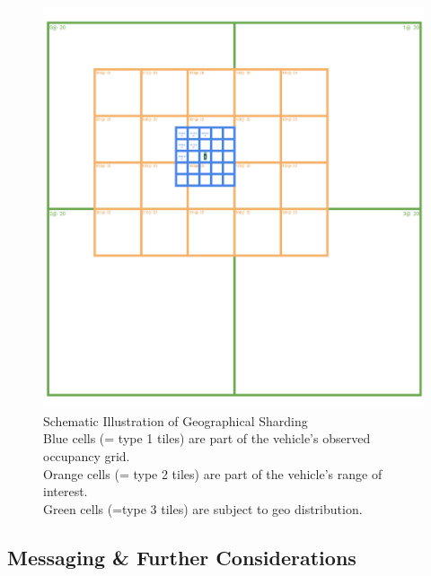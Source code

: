 \begin{figure}
	\centering
	\includegraphics[width=0.9\linewidth]{98_images/geo_subscription_schema}
	\caption[Schematic Illustration of Geographical Sharding]{Schematic Illustration of Geographical Sharding \\ Blue cells (= type 1 tiles) are part of the vehicle's observed occupancy grid. \\ Orange cells (= type 2 tiles) are part of the vehicle's range of interest. \\ Green cells (=type 3 tiles) are subject to geo distribution.}
	\label{fig:geo_distribution_schema}
\end{figure}

\subsection{Messaging \& Further Considerations}
\label{subsec:concept_design:messaging_further_considerations}
